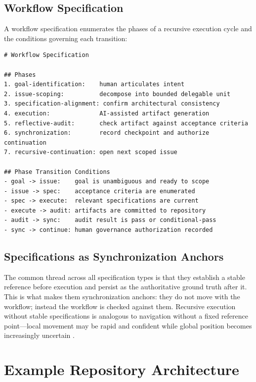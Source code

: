 \subsection{Workflow Specification}

A workflow specification enumerates the phases of a recursive execution cycle and the conditions governing each transition:

\begin{lstlisting}[caption={Workflow specification structure.}, label={lst:workflow-spec}]
# Workflow Specification

## Phases
1. goal-identification:    human articulates intent
2. issue-scoping:          decompose into bounded delegable unit
3. specification-alignment: confirm architectural consistency
4. execution:              AI-assisted artifact generation
5. reflective-audit:       check artifact against acceptance criteria
6. synchronization:        record checkpoint and authorize continuation
7. recursive-continuation: open next scoped issue

## Phase Transition Conditions
- goal -> issue:    goal is unambiguous and ready to scope
- issue -> spec:    acceptance criteria are enumerated
- spec -> execute:  relevant specifications are current
- execute -> audit: artifacts are committed to repository
- audit -> sync:    audit result is pass or conditional-pass
- sync -> continue: human governance authorization recorded
\end{lstlisting}

\subsection{Specifications as Synchronization Anchors}

The common thread across all specification types is that they establish a stable reference before execution and persist as the authoritative ground truth after it. This is what makes them synchronization anchors: they do not move with the workflow; instead the workflow is checked against them. Recursive execution without stable specifications is analogous to navigation without a fixed reference point---local movement may be rapid and confident while global position becomes increasingly uncertain \cite{Hutchins1995CognitionWild}.


\section{Example Repository Architecture}
\label{sec:appendix-repository}

